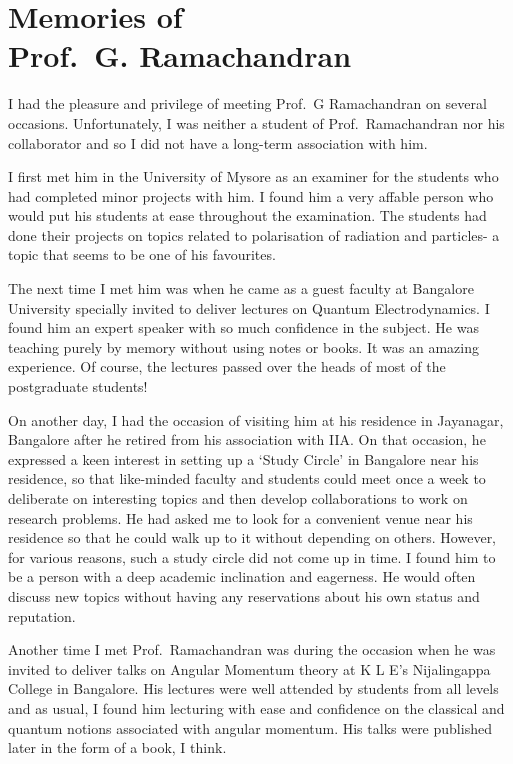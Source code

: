 \chapter[Memories of Prof.\ G. Ramachandran]{Memories of\\ Prof.\ G. Ramachandran}\label{chap21}



I had the pleasure and privilege of meeting Prof.\ G Ramachandran on several occasions. Unfortunately, I was neither a student of Prof.\ Ramachandran nor his collaborator and so I did not have a long-term association with him.


I first met him in the University of Mysore as an examiner for the students who had completed minor projects with him. I found him a very affable person who would put his students at ease throughout the examination. The students had done their projects on topics related to polarisation of radiation and particles- a topic that seems to be one of his favourites.

The next time I met him was when he came as a guest faculty at Bangalore University specially invited to deliver lectures on Quantum Electrodynamics. I found him an expert speaker with so much confidence in the subject. He was teaching purely by memory without using notes or books. It was an amazing experience. Of course, the lectures passed over the heads of most of the postgraduate students!

On another day, I had the occasion of visiting him at his residence in Jayanagar, Bangalore after he retired from his association with IIA. On that occasion, he expressed a keen interest in setting up a `Study Circle' in Bangalore near his residence, so that like-minded faculty and students could meet once a week to deliberate on interesting topics and then develop collaborations to work on research problems. He had asked me to look for a convenient venue near his residence so that he could walk up to it without depending on others. However, for various reasons, such a study circle did not come up in time. I found him to be a person with a deep academic inclination and eagerness. He would often discuss new topics without having any reservations about his own status and reputation.

Another time I met Prof.\ Ramachandran was during the occasion when he was invited to deliver talks on Angular Momentum theory at K L E's Nijalingappa College in Bangalore. His lectures were well attended by students from all levels and as usual, I found him lecturing with ease and confidence on the classical and quantum notions associated with angular momentum. His talks were published later in the form of a book, I think.

